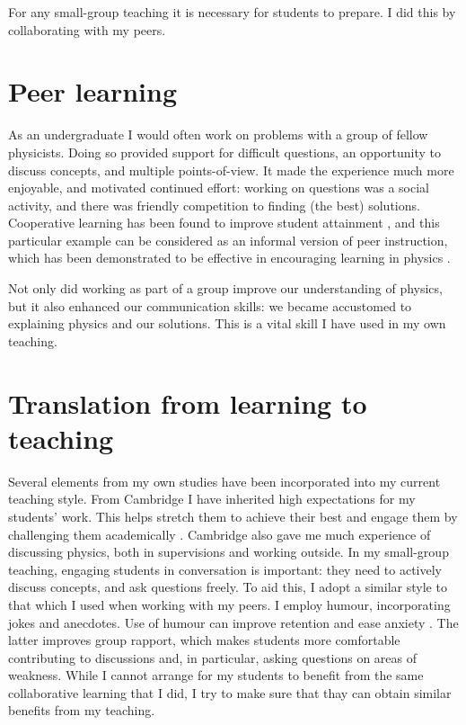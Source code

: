 \documentclass[a4paper, 11pt, twoside]{article}
\begin{document}
For any small-group teaching it is necessary for students to prepare. I did this by collaborating with my peers.

\section{Peer learning}\label{sec:peer}

As an undergraduate I would often work on problems with a group of fellow physicists. Doing so provided support for difficult questions, an opportunity to discuss concepts, and multiple points-of-view. It made the experience much more enjoyable, and motivated continued effort: working on questions was a social activity, and there was friendly competition to finding (the best) solutions. Cooperative learning has been found to improve student attainment \citep{Qin1995,Cabrera2002}, and this particular example can be considered as an informal version of peer instruction, which has been demonstrated to be effective in encouraging learning in physics \citep{Crouch2001,Pilzer2001,Miller2006}.

Not only did working as part of a group improve our understanding of physics, but it also enhanced our communication skills: we became accustomed to explaining physics and our solutions. This is a vital skill I have used in my own teaching.

\section{Translation from learning to teaching}

Several elements from my own studies have been incorporated into my current teaching style. From Cambridge I have inherited high expectations for my students' work. This helps stretch them to achieve their best and engage them by challenging them academically \citep{Bamber2015}. Cambridge also gave me much experience of discussing physics, both in supervisions and working outside. In my small-group teaching, engaging students in conversation is important: they need to actively discuss concepts, and ask questions freely. To aid this, I adopt a similar style to that which I used when working with my peers. I employ humour, incorporating jokes and anecdotes. Use of humour can improve retention and ease anxiety \citep[e.g.,][and references therein]{Korobkin1988,Lesser2008}. The latter improves group rapport, which makes students more comfortable contributing to discussions and, in particular, asking questions on areas of weakness. While I cannot arrange for my students to benefit from the same collaborative learning that I did, I try to make sure that thay can obtain similar benefits from my teaching.



\end{document}
